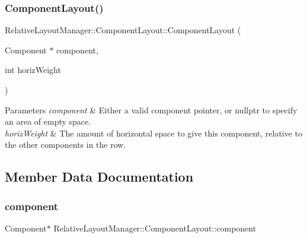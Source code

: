 \subsubsection{\texorpdfstring{Component\+Layout()}{ComponentLayout()}}
{\footnotesize\ttfamily Relative\+Layout\+Manager\+::\+Component\+Layout\+::\+Component\+Layout (\begin{DoxyParamCaption}\item[{Component $\ast$}]{component,  }\item[{int}]{horiz\+Weight }\end{DoxyParamCaption})\hspace{0.3cm}{\ttfamily [inline]}}


\begin{DoxyParams}{Parameters}
{\em component} & Either a valid component pointer, or nullptr to specify an area of empty space.\\
\hline
{\em horiz\+Weight} & The amount of horizontal space to give this component, relative to the other components in the row. \\
\hline
\end{DoxyParams}


\subsection{Member Data Documentation}
\mbox{\label{structRelativeLayoutManager_1_1ComponentLayout_ae48aa58ac00fdfffea477f053abbbe46}} 
\subsubsection{\texorpdfstring{component}{component}}
{\footnotesize\ttfamily Component$\ast$ Relative\+Layout\+Manager\+::\+Component\+Layout\+::component}

\mbox{\label{structRelativeLayoutManager_1_1ComponentLayout_ae3e359a01485325959fcac40b0a5bb17}} 
